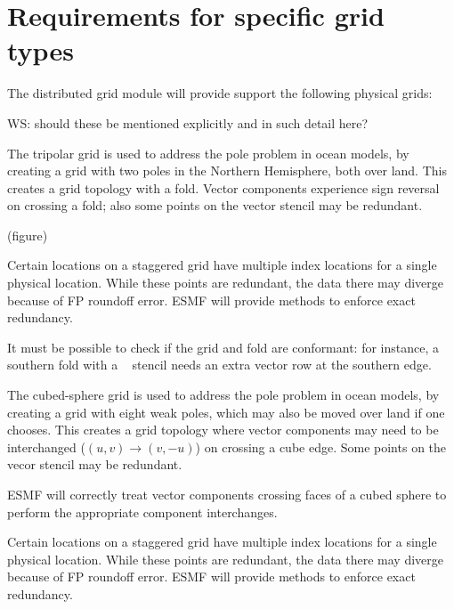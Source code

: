 \part{Requirements for specific grid types} \label{DG:gridtypes}

The distributed grid module will provide support the following 
physical grids:

WS: should these be mentioned explicitly and in such detail here?



The tripolar grid \cite{ref:m1996} is used to address the pole problem
in ocean models, by creating a grid with two poles in the Northern
Hemisphere, both over land. This creates a grid topology with a
fold. Vector components experience sign reversal on crossing a fold;
also some points on the vector stencil may be redundant.

(figure)



Certain locations on a staggered grid have multiple index locations
for a single physical location. While these points are redundant, the
data there may diverge because of FP roundoff error. ESMF will provide
methods to enforce exact redundancy.


It must be possible to check if the grid and fold are conformant:
for instance, a southern fold with a \bgrid~ stencil needs an extra
vector row at the southern edge.


The cubed-sphere grid \cite{ref:rpm1996} is used to address the pole
problem in ocean models, by creating a grid with eight weak poles,
which may also be moved over land if one chooses. This creates a grid
topology where vector components may need to be interchanged
($(u,v)\longrightarrow(v,-u)$) on crossing a cube edge. Some points on
the vecor stencil may be redundant.


ESMF will correctly treat vector components crossing faces of a cubed
sphere to perform the appropriate component interchanges.


Certain locations on a staggered grid have multiple index locations
for a single physical location. While these points are redundant, the
data there may diverge because of FP roundoff error. ESMF will provide
methods to enforce exact redundancy.

